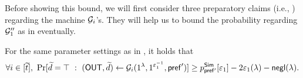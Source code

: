
 Before showing this bound, we will first consider three preparatory claims (i.e., ) regarding the machine $\mathcal{G}_i$'s. They will help us to bound the probability regarding $\mathcal{G}''_1$ as in  eventually.


\begin{MyClaim}\label{pq:claim:bound:Gi} 
For the same parameter settings as in , it holds that 
$$\forall i \in [\widetilde{t}], ~\Pr[\widetilde{d} = \top ~:~ (\mathsf{OUT}, \widetilde{d}) \gets \mathcal{G}_i{(1^\lambda, 1^{\varepsilon_1^{-1}},  \mathsf{pref}')}] \ge p^{\mathsf{Sim}}_{\mathsf{pref'}}[\varepsilon_1] - 2\varepsilon_1(\lambda) -\mathsf{negl}(\lambda).$$
\end{MyClaim} 

